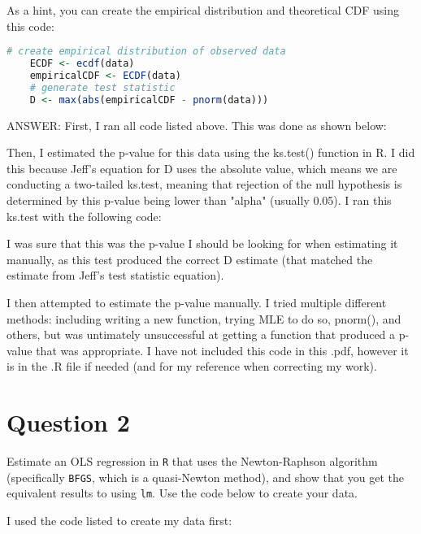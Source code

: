 \documentclass[12pt,letterpaper]{article}
\begin{document}
	
\noindent As a hint, you can create the empirical distribution and theoretical CDF using this code:

\begin{lstlisting}[language=R]
	# create empirical distribution of observed data
	ECDF <- ecdf(data)
	empiricalCDF <- ECDF(data)
	# generate test statistic
	D <- max(abs(empiricalCDF - pnorm(data))) \end{lstlisting}

\vspace{1cm}

ANSWER:
First, I ran all code listed above. This was done as shown below:
 

Then, I estimated the p-value for this data using the ks.test() function in R. I did this because Jeff's equation for D uses the absolute value, which means we are conducting a two-tailed ks.test, meaning that rejection of the null hypothesis is determined by this p-value being lower than "alpha" (usually 0.05). I ran this ks.test with the following code:
	
 	

I was sure that this was the p-value I should be looking for when estimating it manually, as this test produced the correct D estimate (that matched the estimate from Jeff's test statistic equation).


I then attempted to estimate the p-value manually. I tried multiple different methods: including writing a new function, trying MLE to do so, pnorm(), and others, but was untimately unsuccessful at getting a function that produced a p-value that was appropriate. I have not included this code in this .pdf, however it is in the .R file if needed (and for my reference when correcting my work).
	




\section*{Question 2}
\noindent Estimate an OLS regression in \texttt{R} that uses the Newton-Raphson algorithm (specifically \texttt{BFGS}, which is a quasi-Newton method), and show that you get the equivalent results to using \texttt{lm}. Use the code below to create your data.
\vspace{.5cm}

I used the code listed to create my data first:
\end{document}
